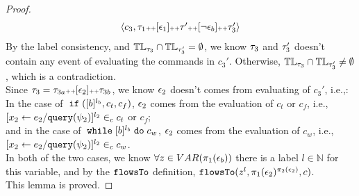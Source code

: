 \begin{proof}
\begin{equation}
\begin{array}{l}
    \langle c_3, 
    \mathtt{\tau}_1 {\scriptscriptstyle ++} [\mathtt{\epsilon}_1]  {\scriptscriptstyle ++} \mathtt{\tau}' {\scriptscriptstyle ++} [\neg \mathtt{\epsilon}_b] {\scriptscriptstyle ++}  \mathtt{\tau}_3' \rangle
  \end{array}
\end{equation}
%
By the label consistency, and $\mathbb{TL}_{\mathtt{\tau}_3} \cap \mathbb{TL}_{\mathtt{\tau}_3'} = \emptyset$, 
we know $\mathtt{\tau}_3$ and $\mathtt{\tau}_3'$ doesn't contain any event of evaluating the commands in $c_3'$.
Otherwise, $\mathbb{TL}_{\mathtt{\tau}_3} \cap \mathbb{TL}_{\mathtt{\tau}_3'} \neq \emptyset$, which is a contradiction.
\\
Since $\mathtt{\tau}_3= \mathtt{\tau}_{3a} {\scriptscriptstyle ++} [\mathtt{\epsilon}_2] {\scriptscriptstyle ++} \mathtt{\tau}_{3b} $, we know $\mathtt{\epsilon}_2$ doesn't comes from evaluating
of $c_3'$, i.e.,:
\\
In the case of $\;\mathtt{if}\; ([b]^{l_b}, c_t, c_f)$, $\mathtt{\epsilon}_2$ comes from the evaluation of $c_t$ or $c_f$,
i.e., $[\mathrel{ {x}_2 \leftarrow e_2 / {\tt query}(\psi_2) }]^{l_2} \in_c c_t$ or $c_f$;
\\
and in the case of $\;\mathtt{while}\; [b]^{l_b} \;\mathtt{do}\; c_w$, $\mathtt{\epsilon}_2$ comes from the evaluation of $c_w$,
i.e., $[\mathrel{ {x}_2 \leftarrow e_2 / {\tt query}(\psi_2) }]^{l_2} \in_c c_w$.
\\
In both of the two cases, we know $\forall z \in VAR(\pi_1(\mathtt{\epsilon}_b)) $ there is a label $l \in \mathbb{N}$ for this variable,
and by the $\mathtt{flowsTo}$ definition, 
$\mathtt{flowsTo}(z^l, \pi_1(\mathtt{\epsilon}_2)^{\pi_2(\mathtt{\epsilon}_2)},c)$.
\\
This lemma is proved.
	\end{proof}

